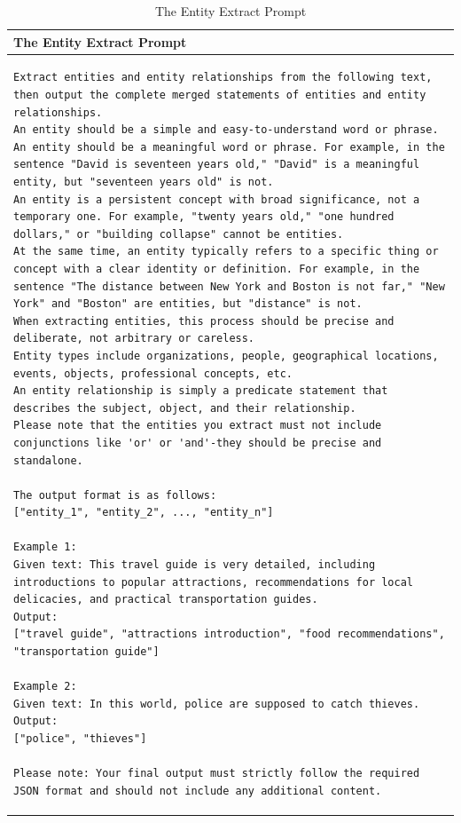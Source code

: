 \begin{table}[h]
\centering
\begin{tabular}{p{\textwidth}}
\toprule
\textbf{The Entity Extract Prompt} \\ 
\midrule
\begin{lstlisting}[basicstyle=\ttfamily\small, frame=single, breaklines=true, breakindent=0pt]
Extract entities and entity relationships from the following text, then output the complete merged statements of entities and entity relationships.  
An entity should be a simple and easy-to-understand word or phrase.  
An entity should be a meaningful word or phrase. For example, in the sentence "David is seventeen years old," "David" is a meaningful entity, but "seventeen years old" is not.  
An entity is a persistent concept with broad significance, not a temporary one. For example, "twenty years old," "one hundred dollars," or "building collapse" cannot be entities.  
At the same time, an entity typically refers to a specific thing or concept with a clear identity or definition. For example, in the sentence "The distance between New York and Boston is not far," "New York" and "Boston" are entities, but "distance" is not.  
When extracting entities, this process should be precise and deliberate, not arbitrary or careless.  
Entity types include organizations, people, geographical locations, events, objects, professional concepts, etc.  
An entity relationship is simply a predicate statement that describes the subject, object, and their relationship.  
Please note that the entities you extract must not include conjunctions like 'or' or 'and'-they should be precise and standalone.

The output format is as follows:  
["entity_1", "entity_2", ..., "entity_n"]

Example 1:  
Given text: This travel guide is very detailed, including introductions to popular attractions, recommendations for local delicacies, and practical transportation guides.  
Output:  
["travel guide", "attractions introduction", "food recommendations", "transportation guide"]

Example 2:  
Given text: In this world, police are supposed to catch thieves.  
Output:  
["police", "thieves"]

Please note: Your final output must strictly follow the required JSON format and should not include any additional content.
\end{lstlisting} \\
\bottomrule
\end{tabular}
\caption{The Entity Extract Prompt}
\label{tab:entity-extract-prompt}
\end{table}

